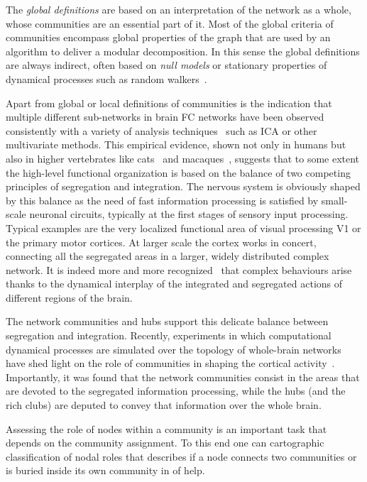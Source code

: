 \documentclass[11pt,              a4paper,              twoside,openright,              titlepage,              headinclude,footinclude,                            numbers=noenddot,              cleardoublepage=empty,]{scrreprt}
\begin{document}
The \emph{global definitions} are based on an interpretation of the network as a whole, whose communities are an essential part of it.
Most of the global criteria of communities encompass global properties of the graph that are used by an algorithm to deliver a modular decomposition.
In this sense the global definitions are always indirect, often based on \emph{null models} or stationary properties of dynamical processes such as random walkers~\cite{pons2006,rosvall2008}.

Apart from global or local definitions of communities is the indication that multiple different sub-networks in brain FC networks have been observed consistently with a variety of analysis techniques~\cite{fox2005,deluca2006,schwarz2007} such as ICA or other multivariate methods.
This empirical evidence, shown not only in humans but also in higher vertebrates like cats~\cite{scannell1995} and macaques~\cite{felleman1991}, suggests that to some extent the high-level functional organization is based on the balance of two competing principles of segregation and integration.
The nervous system is obviously shaped by this balance as the need of fast information processing is satisfied by small-scale neuronal circuits, typically at the first stages of sensory input processing.
Typical examples are the very localized functional area of visual processing V1 or the primary motor cortices. At larger scale the cortex works in concert, connecting all the segregated areas in a larger, widely distributed complex network.
It is indeed more and more recognized~\cite{tononi1994,tononi1998,deco2015} that complex behaviours arise thanks to the dynamical interplay of the integrated and segregated actions of different regions of the brain.

The network communities and hubs support this delicate balance between segregation and integration.
Recently, experiments in which computational dynamical processes are simulated over the topology of whole-brain networks have shed light on the role of communities in shaping the cortical activity~\cite{deco2015}. Importantly, it was found that the network communities consist in the areas that are devoted to the segregated information processing, while the hubs (and the rich clubs) are deputed to convey that information over the whole brain.

Assessing the role of nodes within a community is an important task that depends on the community assignment. To this end one can  cartographic classification of nodal roles that describes if a node connects two communities or is buried inside its own community in of help.
\end{document}
